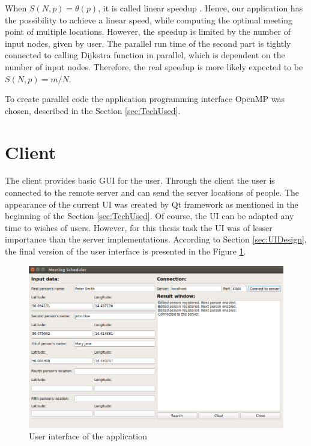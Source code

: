 \documentclass[thesis=M,english]{FITthesis}[2012/10/20]
\begin{document}
When $S(N, p) = \theta(p)$, it is called linear speedup \cite{Tvrdik10}. Hence, our application has the possibility to achieve a linear speed, while computing the optimal meeting point of multiple locations. However, the speedup is limited by the number of input nodes, given by user. The parallel run time of the second part is tightly connected to calling Dijkstra function in parallel, which is dependent on the number of input nodes. Therefore, the real speedup is more likely expected to be $S(N, p) = m/N$.

To create parallel code the application programming interface OpenMP was chosen, described in the Section \ref{sec:TechUsed}.

\newpage
\section{Client}
\label{sec:RClient}
The client provides basic GUI for the user. Through the client the user is connected to the remote server and can send the server locations of people.
The appearance of the current UI was created by Qt framework as mentioned in the beginning of the Section \ref{sec:TechUsed}. Of course, the UI can be adapted any time to wishes of users. However, for this thesis task the UI was of lesser importance than the server implementations. According to Section \ref{sec:UIDesign}, the final version of the user interface is presented in the Figure \ref{pic:UIFinal}.


\begin{figure}[H]
\centering
\includegraphics[width=1\textwidth]{pics/UIFinal}
\caption{User interface of the application}
\label{pic:UIFinal}
\end{figure}
\end{document}

